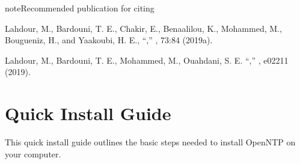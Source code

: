 \documentclass[letterpaper,10pt,english]{sphinxmanual}
\begin{document}
\begin{sphinxadmonition}{note}{Recommended publication for citing}

Lahdour, M., Bardouni, T. E., Chakir, E., Benaalilou, K., Mohammed, M., Bougueniz, H.,
and Yaakoubi, H. E., “,”
, 73:84 \textendash{}  (2019a).

Lahdour, M., Bardouni, T. E., Mohammed, M., Ouahdani, S. E. “,”
, e02211  (2019).
\end{sphinxadmonition}


\chapter{Quick Install Guide}
\label{\detokenize{Installation:quick-install-guide}}\label{\detokenize{Installation::doc}}
This quick install guide outlines the basic steps needed to install OpenNTP on your computer.
\end{document}

